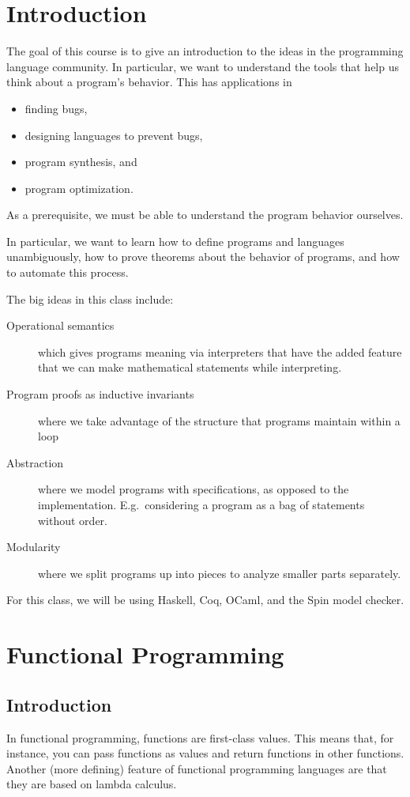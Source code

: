 \documentclass[class=scrartcl]{standalone}
\begin{document}
\chapter{Introduction}
The goal of this course is to give an introduction to
the ideas in the programming language community.
In particular, we want to understand the tools that help us
think about a program's behavior.
This has applications in
\begin{itemize}
  \item finding bugs,
  \item designing languages to prevent bugs,
  \item program synthesis, and
  \item program optimization.
\end{itemize}
As a prerequisite,
we must be able to understand the program behavior ourselves.

In particular, we want to learn
  how to define programs and languages unambiguously,
  how to prove theorems about the behavior of programs, and
  how to automate this process.

The big ideas in this class include:
\begin{description}
  \item[Operational semantics] which gives programs meaning
    via interpreters that have the added feature that we can
    make mathematical statements while interpreting.
  \item[Program proofs as inductive invariants]
    where we take advantage of the structure
    that programs maintain within a loop
  \item[Abstraction] where we model programs with specifications,
    as opposed to the implementation.
    E.g.\ considering a program as a bag of statements without order.
  \item[Modularity] where we split programs up into pieces to analyze
    smaller parts separately.
\end{description}

For this class, we will be using
  Haskell,
  Coq,
  OCaml, and
  the Spin model checker.


\chapter{Functional Programming}
\section{Introduction}
In functional programming, functions are first-class values.
This means that, for instance, you can pass functions as values and
  return functions in other functions.
Another (more defining) feature of functional programming languages are that
they are based on lambda calculus.
\end{document}
